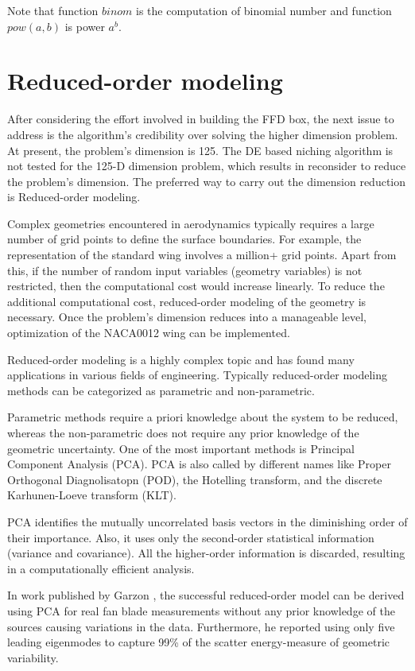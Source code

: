 Note that function $binom$ is the computation of binomial number and function $pow(a, b)$ is power $a^b$.

\section{Reduced-order modeling}
After considering the effort involved in building the FFD box, the next issue to address is the algorithm's credibility over solving the higher dimension problem. At present, the problem's dimension is 125. The DE based niching algorithm is not tested for the 125-D dimension problem, which results in reconsider to reduce the problem's dimension. The preferred way to carry out the dimension reduction is Reduced-order modeling.

Complex geometries encountered in aerodynamics typically requires a large number of grid points to define the surface boundaries. For example, the representation of the standard wing involves a million+ grid points. Apart from this, if the number of random input variables (geometry variables) is not restricted, then the computational cost would increase linearly. To reduce the additional computational cost, reduced-order modeling of the geometry is necessary. Once the problem's dimension reduces into a manageable level, optimization of the NACA0012 wing can be implemented.

Reduced-order modeling is a highly complex topic and has found many applications in various fields of engineering. Typically reduced-order modeling methods can be categorized as parametric and non-parametric.

Parametric methods require a priori knowledge about the system to be reduced, whereas the non-parametric does not require any prior knowledge of the geometric uncertainty. One of the most important methods is Principal Component Analysis (PCA). PCA is also called by different names like Proper Orthogonal Diagnolisatopn (POD), the Hotelling transform, and the discrete Karhunen-Loeve transform (KLT).

PCA identifies the mutually uncorrelated basis vectors in the diminishing order of their importance. Also, it uses only the second-order statistical information (variance and covariance). All the higher-order information is discarded, resulting in a computationally efficient analysis.

In work published by Garzon \cite{garzon}, the successful reduced-order model can be derived using PCA for real fan blade measurements without any prior knowledge of the sources causing variations in the data. Furthermore, he reported using only five leading eigenmodes to capture 99\% of the scatter energy-measure of geometric variability.


